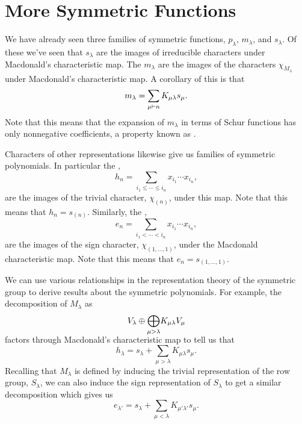 \section{More Symmetric Functions}
We have already seen three families of symmetric functions, \(p_\lambda\), \(m_\lambda\), and \(s_\lambda\).
Of these we've seen that \(s_\lambda\) are the images of irreducible characters under Macdonald's characteristic map.
The \(m_\lambda\) are the images of the characters \(\chi_{M_\lambda}\) under Macdonald's characteristic map.
A corollary of this is that
\begin{equation}
    m_\lambda = \sum_{\mu \vdash n} K_{\mu\lambda} s_\mu.
\end{equation}
Note that this means that the expansion of \(m_\lambda\) in terms of Schur functions has only nonnegative coefficients, a property known as .

Characters of other representations likewise give us families of symmetric polynomials.
In particular the ,
\begin{equation}
    h_n = \sum_{i_1 \le \dotsb \le i_n} x_{i_1} \dotsm x_{i_n},
\end{equation}
are the images of the trivial character, \(\chi_{(n)}\), under this map.
Note that this means that \(h_n = s_{(n)}\).
Similarly, the ,
\begin{equation}
    e_n = \sum_{i_1 < \dotsb < i_n} x_{i_1} \dotsm x_{i_n},
\end{equation}
are the images of the sign character, \(\chi_{(1, \dotsc, 1)}\), under the Macdonald characteristic map.
Note that this means that \(e_n = s_{(1, \dotsc, 1)}\).

We can use various relationships in the representation theory of the symmetric group to derive results about the symmetric polynomials.
For example, the decomposition of \(M_\lambda\) as
\begin{equation}
    V_\lambda \oplus \vphantom{\bigoplus}\smash{\bigoplus_{\mu > \lambda}} K_{\mu\lambda} V_\mu
\end{equation}
factors through Macdonald's characteristic map to tell us that
\begin{equation}
    h_\lambda = s_\lambda + \sum_{\mu > \lambda} K_{\mu\lambda}s_\mu.
\end{equation}
Recalling that \(M_\lambda\) is defined by inducing the trivial representation of the row group, \(S_\lambda\), we can also induce the sign representation of \(S_\lambda\) to get a similar decomposition which gives us
\begin{equation}
    e_{\lambda'} = s_{\lambda} + \sum_{\mu < \lambda} K_{\mu' \lambda'} s_\mu.
\end{equation}

